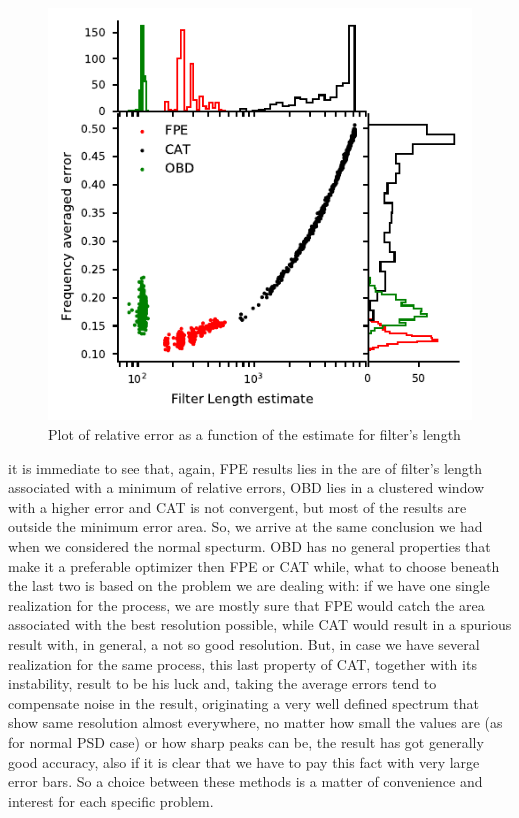 \documentclass[twocolumn,showpacs,preprintnumbers,nofootinbib,prd,
superscriptaddress,10pt]{revtex4-1}
\begin{document}
\begin{figure}
    \centering
    \includegraphics[width = \linewidth]{Images/optimisers_comparison/ligo/error_length_contour.pdf}
    \caption{Plot of relative error as a function of the estimate for filter's length}
    \label{fig:LigoOrderError}
\end{figure}
it is immediate to see that, again, FPE results lies in the are of filter's length associated with a minimum of relative errors, OBD lies in a clustered window with a higher error and CAT is not convergent, but most of the results are outside the minimum error area. So, we arrive at the same conclusion we had when we considered the normal specturm. OBD has no general properties that make it a preferable optimizer then FPE or CAT while, what to choose beneath the last two is based on the problem we are dealing with: if we have one single realization for the process, we are mostly sure that FPE would catch the area associated with the best resolution possible, while CAT would result in a spurious result with, in general, a not so good resolution. But, in case we have several realization for the same process, this last property of CAT, together with its instability, result to be his luck and, taking the average errors tend to compensate noise in the result, originating a very well defined spectrum that show same resolution almost everywhere, no matter how small the values are (as for normal PSD case) or how sharp peaks can be, the result has got generally good accuracy, also if it is clear that we have to pay this fact with very large error bars. So a choice between these methods is a matter of convenience and interest for each specific problem. \\
\end{document}
